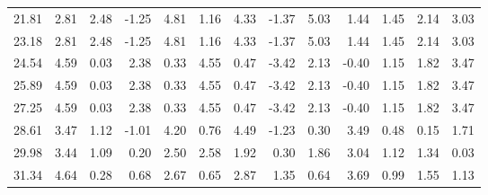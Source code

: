 \begin{tabular}{rrrrrrrrrrrrr}
   21.81 &     2.81 &     2.48 &    -1.25 &     4.81  &     1.16 &     4.33 &    -1.37 &     5.03 &     1.44 &     1.45  &     2.14 &     3.03  \\ 
   23.18 &     2.81 &     2.48 &    -1.25 &     4.81  &     1.16 &     4.33 &    -1.37 &     5.03 &     1.44 &     1.45  &     2.14 &     3.03  \\ 
   24.54 &     4.59 &     0.03 &     2.38 &     0.33  &     4.55 &     0.47 &    -3.42 &     2.13 &    -0.40 &     1.15  &     1.82 &     3.47  \\ 
   25.89 &     4.59 &     0.03 &     2.38 &     0.33  &     4.55 &     0.47 &    -3.42 &     2.13 &    -0.40 &     1.15  &     1.82 &     3.47  \\ 
   27.25 &     4.59 &     0.03 &     2.38 &     0.33  &     4.55 &     0.47 &    -3.42 &     2.13 &    -0.40 &     1.15  &     1.82 &     3.47  \\ 
   28.61 &     3.47 &     1.12 &    -1.01 &     4.20  &     0.76 &     4.49 &    -1.23 &     0.30 &     3.49 &     0.48  &     0.15 &     1.71  \\ 
   29.98 &     3.44 &     1.09 &     0.20 &     2.50  &     2.58 &     1.92 &     0.30 &     1.86 &     3.04 &     1.12  &     1.34 &     0.03  \\ 
   31.34 &     4.64 &     0.28 &     0.68 &     2.67  &     0.65 &     2.87 &     1.35 &     0.64 &     3.69 &     0.99  &     1.55 &     1.13  \\ \hline 
\end{tabular}
